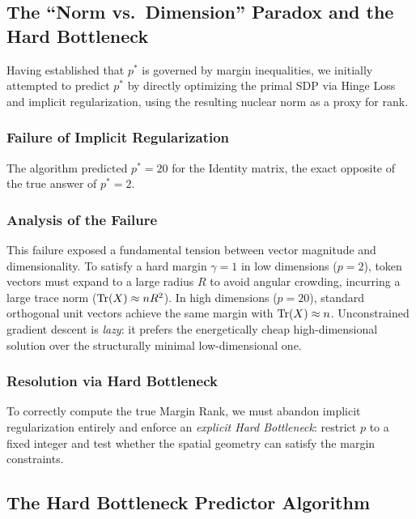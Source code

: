 \subsection{The ``Norm vs.\ Dimension'' Paradox and the Hard Bottleneck}

Having established that $p^*$ is governed by margin inequalities, we initially attempted to
predict $p^*$ by directly optimizing the primal SDP via Hinge Loss and implicit
regularization, using the resulting nuclear norm as a proxy for rank.

\subsubsection{Failure of Implicit Regularization}
The algorithm predicted $p^* = 20$ for the Identity matrix, the exact
opposite of the true answer of $p^* = 2$.

\subsubsection{Analysis of the Failure}
This failure exposed a fundamental tension between vector magnitude
and dimensionality. To satisfy a hard margin $\gamma = 1$ in low dimensions ($p=2$), token
vectors must expand to a large radius $R$ to avoid angular crowding, incurring a large trace
norm ($\operatorname{Tr}(X) \approx nR^2$). In high dimensions ($p=20$), standard orthogonal unit vectors
achieve the same margin with $\operatorname{Tr}(X) \approx n$. Unconstrained gradient descent is
\emph{lazy}: it prefers the energetically cheap high-dimensional solution over the
structurally minimal low-dimensional one.

\subsubsection{Resolution via Hard Bottleneck}
To correctly compute the true Margin Rank, we must abandon implicit
regularization entirely and enforce an \emph{explicit Hard Bottleneck}: restrict $p$ to a
fixed integer and test whether the spatial geometry can satisfy the margin constraints.


\subsection{The Hard Bottleneck Predictor Algorithm}
\label{sec:hard_bottleneck}

